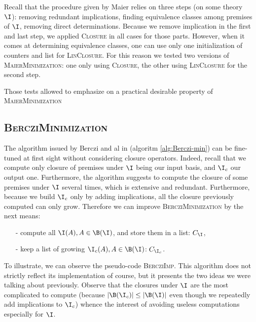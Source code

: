 Recall that the procedure given by Maier relies on three steps (on some theory $\I$): removing redundant implications, finding equivalence classes among premises of $\I$, removing direct determinations. Because we remove implication in the first and last step, we applied \textsc{Closure} in all cases for those
parts. However, when it comes at determining equivalence classes, one can use
only one initialization of counters and list for \textsc{LinClosure}. For this
reason we tested two versions of \textsc{MaierMinimization}: one only using \textsc{Closure}, the other using \textsc{LinClosure} for the second step.

\vspace{1.2em}

Those tests allowed to emphasize on a practical desirable property of \textsc{MaierMinimization}

\begin{figure}[ht]
	
\end{figure}

\subsection{\textsc{BercziMinimization}}

The algorithm issued by Berczi and al in \cite{berczi_directed_2017} (algoritm \ref{alg:Berczi-min}) can be fine-tuned at first sight without considering closure operators. Indeed, recall that we compute only closure of premises under
$\I$ being our input basis, and $\I_c$ our output one. Furthermore, the algorithm suggests to compute the closure of some premises under $\I$ several 
times, which is extensive and redundant. Furthermore, because we build $\I_c$ only by adding implications, all the closure previously computed can only grow.
Therefore we can improve \textsc{BercziMinimization} by the next means:
\begin{itemize}
	\item[-] compute all $\I(A), A \in \B(\I)$, and store them in a list: $C_{\I}$,
	\item[-] keep a list of growing $\I_c(A), A \in \B(\I)$: $C_{\I_c}$.
\end{itemize}
\noindent To illustrate, we can observe the pseudo-code \textsc{BercziImp}. This algorithm does not strictly reflect its implementation of course, but it
presents the two ideas we were talking about previously. Observe that the closures under $\I$ are the most complicated to compute (because $|\B(\I_c)| \leq |\B(\I)|$ even though we repeatedly add implications to $\I_c$) whence
the interest of avoiding useless computations especially for $\I$.

